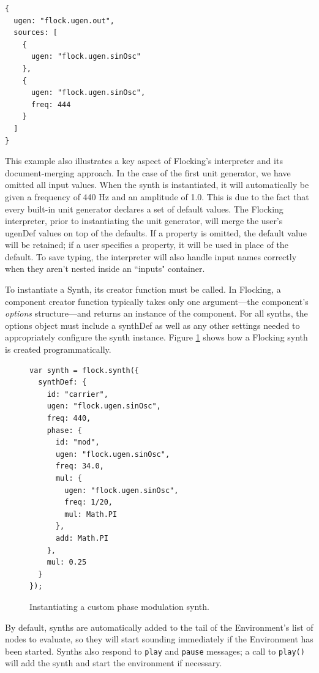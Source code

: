 \documentclass{article}
\begin{document}
\begin{verbatim}
{
  ugen: "flock.ugen.out",
  sources: [
    {
      ugen: "flock.ugen.sinOsc"
    },
    {
      ugen: "flock.ugen.sinOsc",
      freq: 444
    }
  ]
}
\end{verbatim}

This example also illustrates a key aspect of Flocking's interpreter and its document-merging approach. In the case of the first unit generator, we have omitted all input values. When the synth is instantiated, it will automatically be given a frequency of 440 Hz and an amplitude of 1.0. This is due to the fact that every built-in unit generator declares a set of default values. The Flocking interpreter, prior to instantiating the unit generator, will merge the user's ugenDef values on top of the defaults. If a property is omitted, the default value will be retained; if a user specifies a property, it will be used in place of the default. To save typing, the interpreter will also handle input names correctly when they aren't nested inside an ``inputs" container.

To instantiate a Synth, its creator function must be called. In Flocking, a component creator function typically takes only one argument---the component's {\it options} structure---and returns an instance of the component. For all synths, the options object must include a synthDef as well as any other settings needed to appropriately configure the synth instance. Figure \ref{fig:pmSynth} shows how a Flocking synth is created programmatically.

\begin{figure}[h!]
    \begin{verbatim}
var synth = flock.synth({
  synthDef: {
    id: "carrier",
    ugen: "flock.ugen.sinOsc",
    freq: 440,
    phase: {
      id: "mod",
      ugen: "flock.ugen.sinOsc",
      freq: 34.0,
      mul: {
        ugen: "flock.ugen.sinOsc",
        freq: 1/20,
        mul: Math.PI
      },
      add: Math.PI
    },
    mul: 0.25
  }
});
    \end{verbatim}
    \caption{Instantiating a custom phase modulation synth.\label{fig:pmSynth}}
\end{figure}

By default, synths are automatically added to the tail of the Environment's list of nodes to evaluate, so they will start sounding immediately if the Environment has been started. Synths also respond to \verb|play| and \verb|pause| messages; a call to \verb|play()| will add the synth and start the environment if necessary.
\end{document}
